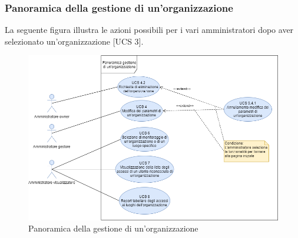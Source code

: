 \newpage
\subsubsection{Panoramica della gestione di un'organizzazione}%
La seguente figura illustra le azioni possibili per i vari amministratori dopo aver selezionato un'organizzazione [UCS 3].
\begin{figure}[h]
	\centering
    \includegraphics[scale=0.53]{sezioni/UseCase/Immagini/Panoramica gestione organizzazione.png}
    \caption{Panoramica della gestione di un'organizzazione}
\end{figure}